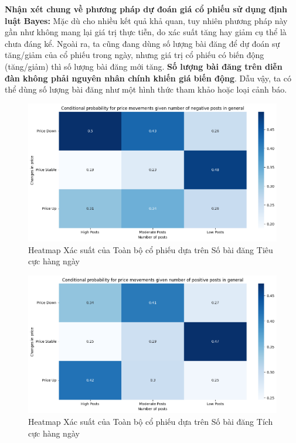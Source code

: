 \textbf{Nhận xét chung về phương pháp dự đoán giá cổ phiếu sử dụng định luật Bayes:} Mặc dù cho nhiều kết quả khả quan, tuy nhiên phương pháp này gần như không mang lại giá trị thực tiễn, do xác suất tăng hay giảm cụ thể là chưa đáng kể. Ngoài ra, ta cũng đang dùng số lượng bài đăng để dự đoán sự tăng/giảm của cổ phiếu trong ngày, nhưng giá trị cổ phiếu có biến động (tăng/giảm) thì số lượng bài đăng mới tăng. \textbf{Số lượng bài đăng trên diễn đàn không phải nguyên nhân chính khiến giá biến động}. Dẫu vậy, ta có thể dùng số lượng bài đăng như một hình thức tham khảo hoặc loại cảnh báo. 

\begin{figure}[H]
    \centering
    \includegraphics[width=0.9\linewidth]{images/plot-5.6-hmgenneg.png}
    \caption{Heatmap Xác suất của Toàn bộ cổ phiếu dựa trên Số bài đăng Tiêu cực hàng ngày}
    \label{fig:5.5}
\end{figure}

\begin{figure}[H]
    \centering
    \includegraphics[width=0.9\linewidth]{images/plot-5.5-hmgenpos.png}
    \caption{Heatmap Xác suất của Toàn bộ cổ phiếu dựa trên Số bài đăng Tích cực hàng ngày}
    \label{fig:5.6}
\end{figure}

